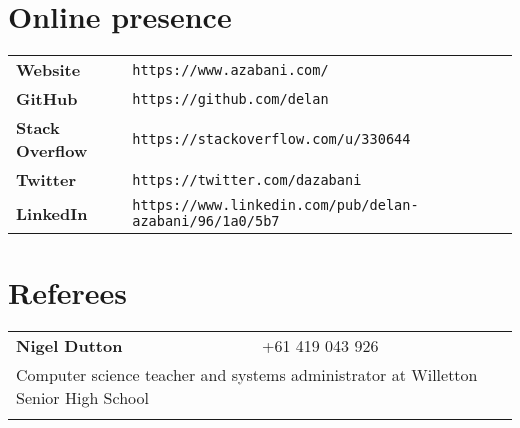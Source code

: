 \documentclass[a4paper,12pt]{article}
\begin{document}
\section*{Online presence}

\begin{tabular}{p{3.5cm}p{12.5cm}}
	\textbf{Website} &
		\texttt{https://www.azabani.com/}\\
	\textbf{GitHub} &
		\texttt{https://github.com/delan}\\
	\textbf{Stack Overflow} &
		\texttt{https://stackoverflow.com/u/330644}\\
	\textbf{Twitter} &
		\texttt{https://twitter.com/dazabani}\\
	\textbf{LinkedIn} &
		\texttt{https://www.linkedin.com/pub/delan-azabani/96/1a0/5b7}
\end{tabular}

\section*{Referees}

\begin{tabular}{p{3.5cm}p{12.5cm}}
	\textbf{Nigel Dutton} &
		+61 419 043 926\\
	\multicolumn{2}{p{17cm}}{
		Computer science teacher and systems administrator
		at Willetton Senior High School
	}\\\\
\end{tabular}
\end{document}
